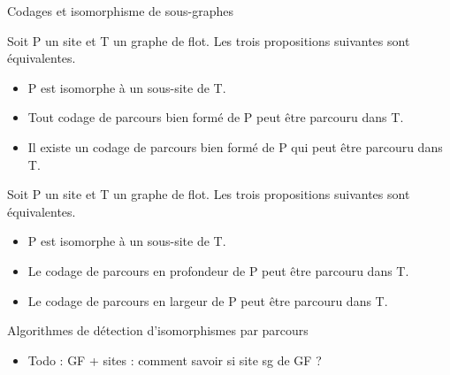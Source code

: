 \documentclass{beamer}
\begin{document}
\begin{frame}{Codages et isomorphisme de sous-graphes}
\begin{theo}
 Soit P un site et T un graphe de flot. Les trois propositions suivantes sont équivalentes.
 \begin{itemize}
  \item P est isomorphe à un sous-site de T.
  \item Tout codage de parcours bien formé de P peut être parcouru dans T.
  \item Il existe un codage de parcours bien formé de P qui peut être parcouru dans T.
 \end{itemize}
\end{theo}
\pause
\begin{cor}
 Soit P un site et T un graphe de flot. Les trois propositions suivantes sont équivalentes.
 \begin{itemize}
  \item P est isomorphe à un sous-site de T.
  \item Le codage de parcours en profondeur de P peut être parcouru dans T.
  \item Le codage de parcours en largeur de P peut être parcouru dans T.
 \end{itemize}
\label{cor:gf}
\end{cor}
\end{frame}

\begin{frame}{Algorithmes de détection d'isomorphismes par parcours}
 \begin{itemize}
  \item Todo : GF + sites : comment savoir si site sg de GF ?
 \end{itemize}
\end{frame}
\end{document}
